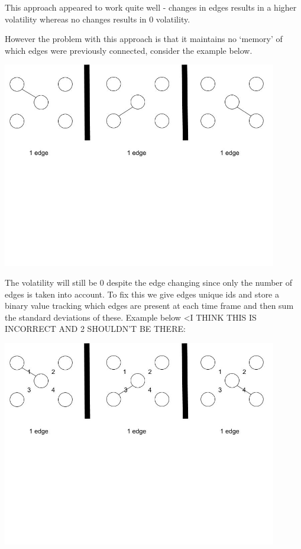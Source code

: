 This approach appeared to work quite well - changes in edges results in a higher volatility whereas no changes results in 0 volatility.

However the problem with this approach is that it maintains no ‘memory’ of which edges were previously connected, consider the example below.
\begin{center}
\includegraphics[trim={0 10cm 0 -1cm}, width=120mm]{./Figures/volatility3.jpg}
\end{center}

The volatility will still be 0 despite the edge changing since only the number of edges is taken into account.
To fix this we give edges unique ids and store a binary value tracking which edges are present at each time frame and then sum the standard deviations of these. Example below <I THINK THIS IS INCORRECT AND 2 SHOULDN'T BE THERE:

\begin{center}
\includegraphics[trim={0 10cm 0 -1cm}, width=120mm]{./Figures/volatility4.jpg}
\end{center}

